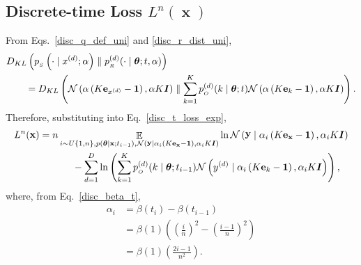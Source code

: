 \documentclass[11pt,table]{article}
\DeclareMathOperator*{\E}{\mathbb{E}}
\DeclareMathOperator{\x}{\mathbf{x}}
\DeclareMathOperator{\y}{\mathbf{y}}
\newcommand{\kl}[2]{D_{KL}\left(#1 \parallel #2\right)}
\newcommand{\N}[2]{\mathcal{N}\left(#1 , #2\right)}
\newcommand{\I}[1]{\boldsymbol{I}}
\newcommand{\tidx}[2]{#1_{#2}}
\newcommand{\didx}[2]{#1^{(#2)}}
\renewcommand{\vec}[1]{\boldsymbol{#1}}
\newcommand{\pars}{\theta}
\newcommand{\parsn}{\vec{\pars}}
\newcommand{\alphat}[1]{\tidx{\alpha}{#1}}
\newcommand{\0}[1]{\constvec{0}{#1}}
\newcommand{\1}[1]{\constvec{1}{#1}}
\newcommand{\yd}{y}
\newcommand{\ydd}[1]{\didx{\yd}{#1}}
\newcommand{\xdd}[1]{\didx{x}{#1}}
\newcommand{\oh}[2]{\mathbf{e}_{#1}}
\newcommand{\sender}[2]{p_{_S}\left(#1 \mid #2\right)}
\newcommand{\out}{p_{_O}}
\newcommand{\rec}{p_{_R}}
\begin{document}
\subsection{Discrete-time Loss \texorpdfstring{$L^{n}(\x)$}{}}
From Eqs.~\ref{disc_q_def_uni} and \ref{disc_r_dist_uni},
\begin{align}
&\kl{\sender{\cdot}{\xdd{d}; \alpha}}{\rec^{(d)}(\cdot \mid \parsn; t, \alpha)}\\ 
&\qquad=\kl{\N{\alpha\left(K \oh{\xdd{d}}{K} - \1{K}\right)}{\alpha K \I{K}}}{\sum_{k=1}^K \out^{(d)}(k \mid \parsn; t) \N{\alpha\left(K\oh{k}{K}- \1{K}\right)}{\alpha K \I{K}}}.
\end{align}
Therefore, substituting into Eq.~\ref{disc_t_loss_exp},
\begin{align}
&L^{n}(\x) = n\E_{i \sim U\{1,n\},p(\parsn \mid \x ; t_{i-1}),\N{\y \mid \alphat{i}\left(K \oh{\x}{KD} - \1{KD}\right)}{\alphat{i} K \I{KD}}} \ln \N{\y \mid \alphat{i}\left(K \oh{\x}{KD} - \1{KD}\right)}{\alphat{i} K \I{KD}}\\
&\qquad\qquad\qquad-\sum_{d=1}^D \ln \left(\sum_{k=1}^K \out^{(d)}(k \mid \parsn; t_{i-1}) \N{\ydd{d} \mid \alphat{i}\left(K\oh{k}{K}- \1{K}\right)}{\alphat{i} K \I{K}}\right),\label{discdisc_t_loss_exp}
\end{align}
where, from Eq.~\ref{disc_beta_t},
\begin{align}
\alpha_i &= \beta(t_i) - \beta(t_{i-1})\\
&= \beta(1)\left(\left(\frac{i}{n}\right)^2 - \left(\frac{i-1}{n}\right)^2\right)\\
&= \beta(1)\left(\frac{2i -1}{n^2}\right).
\end{align}
\end{document}
